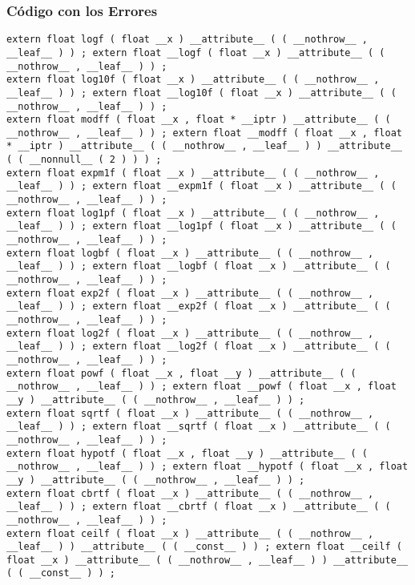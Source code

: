 \documentclass{beamer}
\begin{document}
\begin{frame}[fragile]
\frametitle{C\'odigo con los Errores}
\begin{verbatim}
extern float logf ( float __x ) __attribute__ ( ( __nothrow__ , __leaf__ ) ) ; extern float __logf ( float __x ) __attribute__ ( ( __nothrow__ , __leaf__ ) ) ; 
extern float log10f ( float __x ) __attribute__ ( ( __nothrow__ , __leaf__ ) ) ; extern float __log10f ( float __x ) __attribute__ ( ( __nothrow__ , __leaf__ ) ) ; 
extern float modff ( float __x , float * __iptr ) __attribute__ ( ( __nothrow__ , __leaf__ ) ) ; extern float __modff ( float __x , float * __iptr ) __attribute__ ( ( __nothrow__ , __leaf__ ) ) __attribute__ ( ( __nonnull__ ( 2 ) ) ) ; 
extern float expm1f ( float __x ) __attribute__ ( ( __nothrow__ , __leaf__ ) ) ; extern float __expm1f ( float __x ) __attribute__ ( ( __nothrow__ , __leaf__ ) ) ; 
extern float log1pf ( float __x ) __attribute__ ( ( __nothrow__ , __leaf__ ) ) ; extern float __log1pf ( float __x ) __attribute__ ( ( __nothrow__ , __leaf__ ) ) ; 
extern float logbf ( float __x ) __attribute__ ( ( __nothrow__ , __leaf__ ) ) ; extern float __logbf ( float __x ) __attribute__ ( ( __nothrow__ , __leaf__ ) ) ; 
extern float exp2f ( float __x ) __attribute__ ( ( __nothrow__ , __leaf__ ) ) ; extern float __exp2f ( float __x ) __attribute__ ( ( __nothrow__ , __leaf__ ) ) ; 
extern float log2f ( float __x ) __attribute__ ( ( __nothrow__ , __leaf__ ) ) ; extern float __log2f ( float __x ) __attribute__ ( ( __nothrow__ , __leaf__ ) ) ; 
extern float powf ( float __x , float __y ) __attribute__ ( ( __nothrow__ , __leaf__ ) ) ; extern float __powf ( float __x , float __y ) __attribute__ ( ( __nothrow__ , __leaf__ ) ) ; 
extern float sqrtf ( float __x ) __attribute__ ( ( __nothrow__ , __leaf__ ) ) ; extern float __sqrtf ( float __x ) __attribute__ ( ( __nothrow__ , __leaf__ ) ) ; 
extern float hypotf ( float __x , float __y ) __attribute__ ( ( __nothrow__ , __leaf__ ) ) ; extern float __hypotf ( float __x , float __y ) __attribute__ ( ( __nothrow__ , __leaf__ ) ) ; 
extern float cbrtf ( float __x ) __attribute__ ( ( __nothrow__ , __leaf__ ) ) ; extern float __cbrtf ( float __x ) __attribute__ ( ( __nothrow__ , __leaf__ ) ) ; 
extern float ceilf ( float __x ) __attribute__ ( ( __nothrow__ , __leaf__ ) ) __attribute__ ( ( __const__ ) ) ; extern float __ceilf ( float __x ) __attribute__ ( ( __nothrow__ , __leaf__ ) ) __attribute__ ( ( __const__ ) ) ; 
\end{verbatim}
\end{frame}
\end{document}
